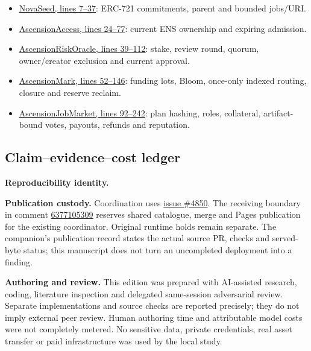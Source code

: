 \begin{itemize}
\item \href{https://github.com/MontrealAI/AGI-Alpha-Agent-v0/blob/197147ffd22c5ae13113162afffaf3ce9c10aa2e/contracts/ascension/NovaSeed.sol\#L7-L37}{NovaSeed, lines 7--37}: ERC-721 commitments, parent and bounded jobs/URI.
\item \href{https://github.com/MontrealAI/AGI-Alpha-Agent-v0/blob/197147ffd22c5ae13113162afffaf3ce9c10aa2e/contracts/ascension/AscensionAccess.sol\#L24-L77}{AscensionAccess, lines 24--77}: current ENS ownership and expiring admission.
\item \href{https://github.com/MontrealAI/AGI-Alpha-Agent-v0/blob/197147ffd22c5ae13113162afffaf3ce9c10aa2e/contracts/ascension/AscensionRiskOracle.sol\#L39-L112}{AscensionRiskOracle, lines 39--112}: stake, review round, quorum, owner/creator exclusion and current approval.
\item \href{https://github.com/MontrealAI/AGI-Alpha-Agent-v0/blob/197147ffd22c5ae13113162afffaf3ce9c10aa2e/contracts/ascension/AscensionMark.sol\#L52-L146}{AscensionMark, lines 52--146}: funding lots, Bloom, once-only indexed routing, closure and reserve reclaim.
\item \href{https://github.com/MontrealAI/AGI-Alpha-Agent-v0/blob/197147ffd22c5ae13113162afffaf3ce9c10aa2e/contracts/ascension/AscensionJobMarket.sol\#L92-L242}{AscensionJobMarket, lines 92--242}: plan hashing, roles, collateral, artifact-bound votes, payouts, refunds and reputation.
\end{itemize}

\subsection{Claim--evidence--cost ledger}
\ClaimLedger

\textbf{Reproducibility identity.} \FreezeIdentity

\textbf{Publication custody.} Coordination uses \href{https://github.com/MontrealAI/AGI-Alpha-Agent-v0/issues/4850}{issue \#4850}. The receiving boundary in comment \href{https://github.com/MontrealAI/AGI-Alpha-Agent-v0/issues/4850\#issuecomment-6377105309}{6377105309} reserves shared catalogue, merge and Pages publication for the existing coordinator. Original runtime holds remain separate. The companion's publication record states the actual source PR, checks and served-byte status; this manuscript does not turn an uncompleted deployment into a finding.

\textbf{Authoring and review.} This edition was prepared with AI-assisted research, coding, literature inspection and delegated same-session adversarial review. Separate implementations and source checks are reported precisely; they do not imply external peer review. Human authoring time and attributable model costs were not completely metered. No sensitive data, private credentials, real asset transfer or paid infrastructure was used by the local study.


